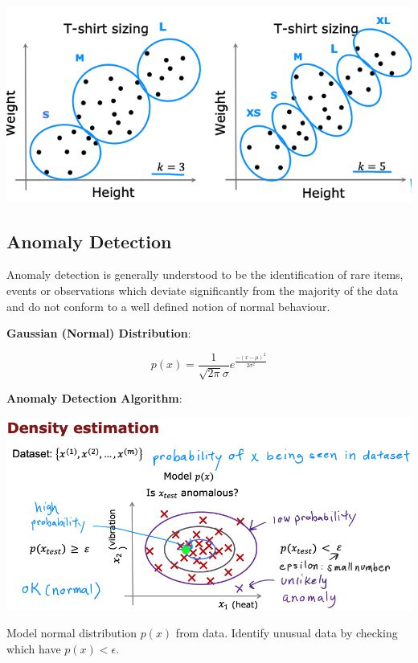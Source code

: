 \documentclass{article}
\begin{document}
\begin{center}
\includegraphics[scale=0.5]{./images/k_means_choose_k_later.png}
\end{center}

\subsection{Anomaly Detection}

\noindent Anomaly detection is generally understood to be the identification of rare items, events or observations which deviate significantly from the majority of the data and do not conform to a well defined notion of normal behaviour.

\bigskip

\noindent \textbf{Gaussian (Normal) Distribution}:

\[p(x) = \frac{1}{\sqrt{2\pi}\sigma} e^{\frac{-(x - \mu)^2}{2\sigma^2}}\]

\noindent \textbf{Anomaly Detection Algorithm}:

\begin{center}
\includegraphics[scale=0.3]{./images/anomaly_detection_density_estimation.png}
\end{center}

\noindent Model normal distribution \(p(x)\) from data. Identify unusual data by checking which have \(p(x) < \epsilon\).
\end{document}

